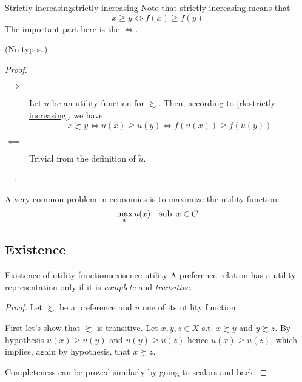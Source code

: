 \documentclass[12pt]{extarticle}
\begin{document}
\begin{remark}{Strictly increasing}{strictly-increasing}
    Note that strictly increasing means that
    \begin{equation}
        x \geq y \iff f(x) \geq f(y)
    \end{equation}
    The important part here is the $\iff$.

    (No typos.)
\end{remark}

\begin{proof}
    \skiplineafterproof
    \begin{description}
        \item[$\implies$] Let $u$ be an utility function for $\succsim$.
              Then, according to \cref{rk:strictly-increasing}, we have
              \begin{equation}
                  x \succsim y \iff u(x) \geq u(y) \iff f(u(x)) \geq f(u(y))
              \end{equation}
        \item[$\impliedby$] Trivial from the definition of $\tilde{u}$.
    \end{description}
\end{proof}

A very common problem in economics is to maximize the utility function:
\begin{equation}
    \max_x u(x) \quad {\operatorfont sub} \enspace  x \in C
\end{equation}

\subsection{Existence}

\begin{theorem}{Existence of utility functions}{exisence-utility}
    A preference relation has a utility representation only if it is
    \emph{complete} and \emph{transitive}.
\end{theorem}

\begin{proof}
    Let $\succsim$ be a preference and $u$ one of its utility function.

    First let's show that $\succsim$ is transitive.
    Let $x, y, z \in X$ s.t. $x \succsim y$ and $y \succsim z$. By hypothesis $u(x) \geq u(y)$ and $u(y) \geq u(z)$ hence $u(x) \geq u(z)$, which implies, again by hypothesis, that $x \succsim z$.

    Completeness can be proved similarly by going to scalars and back.
\end{proof}
\end{document}
